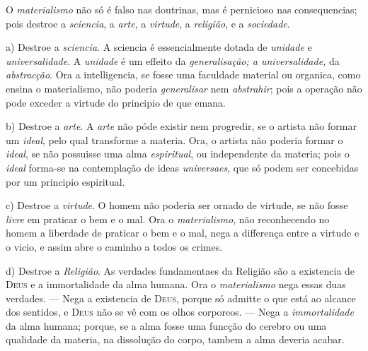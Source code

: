 
 
O \emph{materialismo} não só é falso nas doutrinas, mas é pernicioso nas consequencias; pois destroe a \emph{sciencia}, a \emph{arte}, a \emph{virtude}, a \emph{religião}, e a \emph{sociedade}.

a) Destroe a \emph{sciencia}. A sciencia é essencialmente dotada de \emph{unidade} e \emph{universalidade}. A \emph{unidade} é um effeito da \emph{generalisação; a universalidade,} da \emph{abstracção}. Ora a intelligencia, se fosse  uma faculdade material ou organica, como ensina o materialismo, não poderia \emph{generalisar} nem \emph{abstrahir}; pois a operação não pode exceder a virtude do principio de que emana.

b) Destroe a \emph{arte}. A \emph{arte} não póde existir nem progredir, se o artista não formar um \emph{ideal}, pelo qual transforme a materia. Ora, o artista não poderia formar o \emph{ideal}, se não possuisse  uma alma \emph{espiritual}, ou independente da materia; pois o \emph{ideal} forma-se na contemplação de ideas \emph{universaes}, que só podem ser concebidas por um principio espiritual.

c) Destroe a \emph{virtude}. O homem não poderia ser ornado de virtude, se não fosse \emph{livre} em praticar o bem e o mal. Ora o \emph{materialismo}, não reconhecendo no homem a liberdade  de praticar o bem e o mal, nega a differença entre a virtude e o vicio, e assim abre o caminho a todos os crimes.

d) Destroe a \emph{Religião}. As verdades fundamentaes da Religião  são a existencia de \textsc{Deus} e a immortalidade da alma humana. Ora o \emph{materialismo} nega essas duas verdades. --- Nega a existencia de \textsc{Deus}, porque só admitte o que está ao alcance  dos sentidos, e \textsc{Deus} não se vê com os olhos corporeos. --- Nega a \emph{immortalidade} da alma humana; porque, se a alma fosse  uma funcção do cerebro ou uma qualidade da materia, na dissolução do corpo, tambem a alma deveria acabar.

